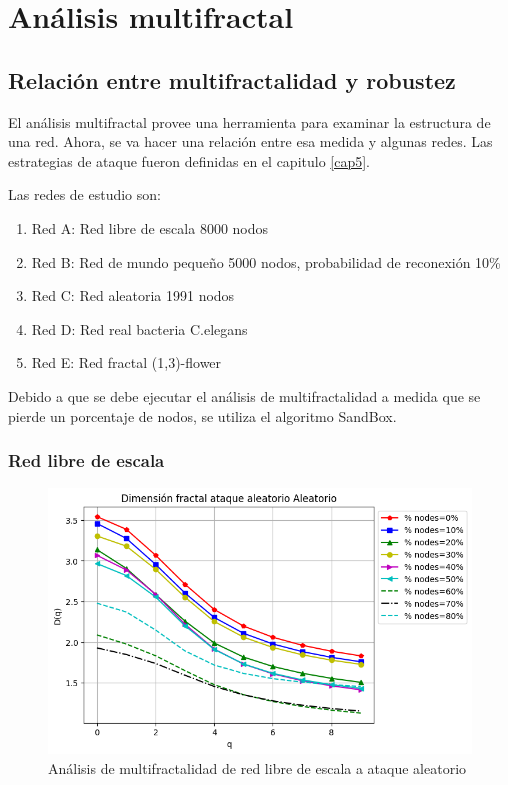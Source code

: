 \section{Análisis multifractal}

\subsection{Relación entre multifractalidad y robustez}

El análisis multifractal provee una herramienta para examinar la estructura de una red. Ahora, se va hacer una relación entre esa medida y algunas redes. Las estrategias de ataque fueron definidas en el capitulo \ref{cap5}.

Las redes de estudio son:

\begin{enumerate}
    \item Red A: Red libre de escala 8000 nodos
    \item Red B: Red de mundo pequeño 5000 nodos, probabilidad de reconexión 10\%
    \item Red C: Red aleatoria 1991 nodos
    \item Red D: Red real bacteria C.elegans
    \item Red E: Red fractal (1,3)-flower
\end{enumerate}

Debido a que se debe ejecutar el análisis de multifractalidad a medida que se pierde un porcentaje de nodos, se utiliza el algoritmo SandBox.

\subsubsection{Red libre de escala}

\begin{figure}[H]
    \centering
    \includegraphics[scale=0.7]{Capitulo6MultifractalidadYRobustez/imagenes/grafica_DqRandom20180512_143117ScaleFree8000Nodes.png}
    \caption{Análisis de multifractalidad de red libre de escala a ataque aleatorio }
\end{figure}

